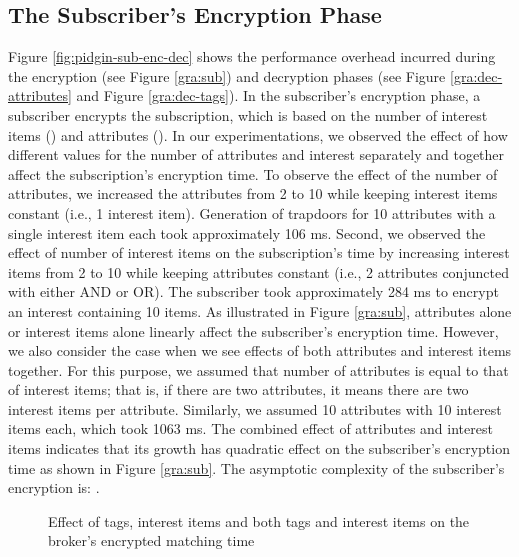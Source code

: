 \documentclass[epsfig,a4paper,11pt,titlepage]{book}
\numberwithin{algorithm}{chapter}
\begin{document}
\subsection{The Subscriber's Encryption Phase}
Figure \ref{fig:pidgin-sub-enc-dec} shows the performance overhead incurred during the encryption (see Figure \ref{gra:sub}) and decryption phases (see Figure \ref{gra:dec-attributes} and Figure \ref{gra:dec-tags}). In the subscriber's encryption phase, a subscriber encrypts the subscription, which is based on the number of interest items () and attributes (). In our experimentations, we observed the effect of how different values for the number of attributes and interest separately and together affect the subscription's encryption time. To observe the effect of the number of attributes, we increased the attributes from 2 to 10 while keeping interest items constant (i.e., 1 interest item). Generation of trapdoors for 10 attributes with a single interest item each took approximately 106 \gls{ms}. Second, we observed the effect of number of interest items on the subscription's time by increasing interest items from 2 to 10 while keeping attributes constant (i.e., 2 attributes conjuncted with either AND or OR). The subscriber took approximately 284 \gls{ms} to encrypt an interest containing 10 items. As illustrated in Figure \ref{gra:sub}, attributes alone or interest items alone linearly affect the subscriber's encryption time. However, we also consider the case when we see effects of both attributes and interest items together. For this purpose, we assumed that number of attributes is equal to that of interest items; that is, if there are two attributes, it means there are two interest items per attribute. Similarly, we assumed 10 attributes with 10 interest items each, which took 1063 \gls{ms}. The combined effect of attributes and interest items indicates that its growth has quadratic effect on the subscriber's encryption time as shown in Figure \ref{gra:sub}. The asymptotic complexity of the subscriber's encryption is: .

\begin{figure}
\centering


\caption[Effect of tags and interest items on the broker's encrypted matching time]{Effect of  tags,  interest items and  both tags and interest items on the broker's encrypted matching time}
\label{fig:pidgin-bro}
\end{figure}
\end{document}
